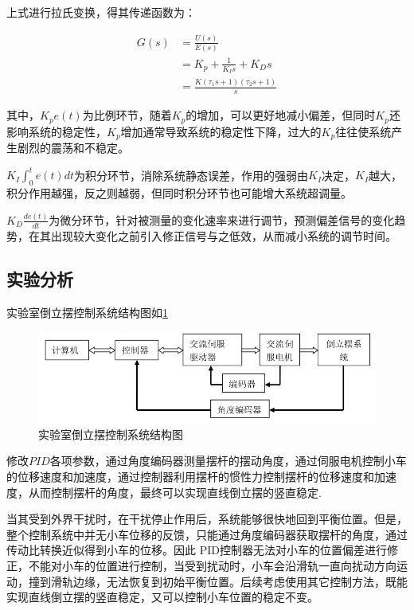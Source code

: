 \documentclass{MathorCupmodeling}
\begin{document}
上式进行拉氏变换，得其传递函数为：

\begin{equation}
\begin{aligned}
G(s)&=\frac{U(s)}{E(s)}\\
&=K_p+\frac{1}{K_Is}+K_Ds\\
&=\frac{K(\tau_1s+1)(\tau_2s+1)}{s}
\end{aligned}
\end{equation}

其中，$K_pe(t)$为比例环节，随着$K_p$的增加，可以更好地减小偏差，但同时$K_p$还影响系统的稳定性，$K_p$增加通常导致系统的稳定性下降，过大的$K_p$往往使系统产生剧烈的震荡和不稳定。

$K_I\int_0^te(t)dt$为积分环节，消除系统静态误差，作用的强弱由$K_I$决定，$K_I$越大，积分作用越强，反之则越弱，但同时积分环节也可能增大系统超调量。

$K_D\frac{de(t)}{dt}$为微分环节，针对被测量的变化速率来进行调节，预测偏差信号的变化趋势，在其出现较大变化之前引入修正信号与之低效，从而减小系统的调节时间。

\subsection{实验分析}

实验室倒立摆控制系统结构图如\cref{实验室倒立摆控制系统结构图}

\begin{figure}[hbpt]
\centering
\includegraphics[width=12cm]{实验室倒立摆控制系统结构图.png}
\caption{实验室倒立摆控制系统结构图}\label{实验室倒立摆控制系统结构图}
\end{figure}

修改$PID$各项参数，通过角度编码器测量摆杆的摆动角度，通过伺服电机控制小车的位移速度和加速度，通过控制器利用摆杆的惯性力控制摆杆的位移速度和加速度，从而控制摆杆的角度，最终可以实现直线倒立摆的竖直稳定.

当其受到外界干扰时，在干扰停止作用后，系统能够很快地回到平衡位置。但是，整个控制系统中并无小车位移的反馈，只能通过角度编码器获取摆杆的角度，通过传动比转换近似得到小车的位移。因此 PID控制器无法对小车的位置偏差进行修正，不能对小车的位置进行控制，当受到扰动时，小车会沿滑轨一直向扰动方向运动，撞到滑轨边缘，无法恢复到初始平衡位置。后续考虑使用其它控制方法，既能实现直线倒立摆的竖直稳定，又可以控制小车位置的稳定不变。
\end{document}
